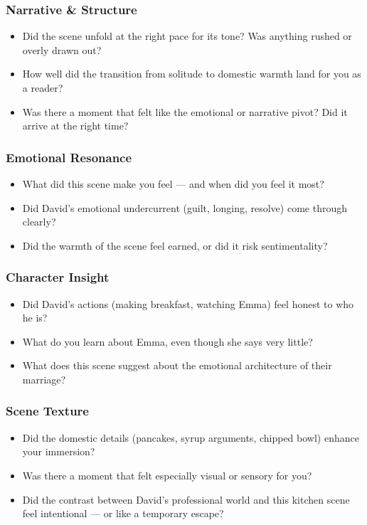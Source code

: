 \subsubsection{Narrative \& Structure}

\begin{itemize}
  \item Did the scene unfold at the right pace for its tone? Was anything rushed or overly drawn out?
  \item How well did the transition from solitude to domestic warmth land for you as a reader?
  \item Was there a moment that felt like the emotional or narrative pivot? Did it arrive at the right time?
\end{itemize}

\subsubsection{Emotional Resonance}

\begin{itemize}
  \item What did this scene make you feel — and when did you feel it most?
  \item Did David’s emotional undercurrent (guilt, longing, resolve) come through clearly?
  \item Did the warmth of the scene feel earned, or did it risk sentimentality?
\end{itemize}

\subsubsection{Character Insight}

\begin{itemize}
  \item Did David’s actions (making breakfast, watching Emma) feel honest to who he is?
  \item What do you learn about Emma, even though she says very little?
  \item What does this scene suggest about the emotional architecture of their marriage?
\end{itemize}

\subsubsection{Scene Texture}

\begin{itemize}
  \item Did the domestic details (pancakes, syrup arguments, chipped bowl) enhance your immersion?
  \item Was there a moment that felt especially visual or sensory for you?
  \item Did the contrast between David’s professional world and this kitchen scene feel intentional — or like a temporary escape?
\end{itemize}

